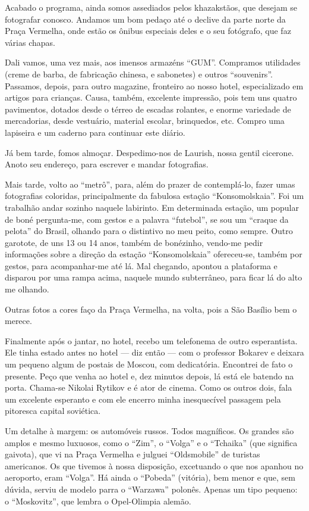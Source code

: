 Acabado o programa, ainda somos assediados pelos khazakstãos, que desejam se fotografar conosco. Andamos um bom pedaço até o declive da parte norte da Praça Vermelha, onde estão os ônibus especiais deles e o seu fotógrafo, que faz várias chapas.

Dali vamos, uma vez mais, aos imensos armazéns ``GUM''. Compramos utilidades (creme de barba, de fabricação chinesa, e sabonetes) e outros ``souvenirs''. Passamos, depois, para outro magazine, fronteiro ao nosso hotel, especializado em artigos para crianças. Causa, também, excelente impressão, pois tem uns quatro pavimentos, dotados desde o térreo de escadas rolantes, e enorme variedade de mercadorias, desde vestuário, material escolar, brinquedos, etc. Compro uma lapiseira e um caderno para continuar este diário.

Já bem tarde, fomos almoçar. Despedimo-nos de Laurish, nossa gentil cicerone. Anoto seu endereço, para escrever e mandar fotografias.

Mais tarde, volto ao ``metrô'', para, além do prazer de contemplá-lo, fazer umas fotografias coloridas, principalmente da fabulosa estação ``Konsomolskaia''. Foi um trabalhão andar sozinho naquele labirinto. Em determinada estação, um popular de boné pergunta-me, com gestos e a palavra ``futebol'', se sou um ``craque da pelota'' do Brasil, olhando para o distintivo no meu peito, como sempre. Outro garotote, de uns 13 ou 14 anos, também de bonézinho, vendo-me pedir informações sobre a direção da estação ``Konsomolskaia'' ofereceu-se, também por gestos, para acompanhar-me até lá. Mal chegando, apontou a plataforma e disparou por uma rampa acima, naquele mundo subterrâneo, para ficar lá do alto me olhando.

Outras fotos a cores faço da Praça Vermelha, na volta, pois a São Basílio bem o merece.

Finalmente após o jantar, no hotel, recebo um telefonema de outro esperantista. Ele tinha estado antes no hotel --- diz então --- com o professor Bokarev e deixara um pequeno algum de postais de Moscou, com dedicatória. Encontrei de fato o presente. Peço que venha ao hotel e, dez minutos depois, lá está ele batendo na porta. Chama-se Nikolai Rytikov e é ator de cinema. Como os outros dois, fala um excelente esperanto e com ele encerro minha inesquecível passagem pela pitoresca capital soviética.

Um detalhe à margem: os automóveis russos. Todos magníficos. Os grandes são amplos e mesmo luxuosos, como o ``Zim'', o ``Volga'' e o ``Tchaika'' (que significa gaivota), que vi na Praça Vermelha e julguei ``Oldsmobile'' de turistas americanos. Os que tivemos à nossa disposição, excetuando o que nos apanhou no aeroporto, eram ``Volga''. Há ainda o ``Pobeda'' (vitória), bem menor e que, sem dúvida, serviu de modelo parra o ``Warzawa'' polonês. Apenas um tipo pequeno: o ``Moskovitz'', que lembra o Opel-Olimpia alemão.

